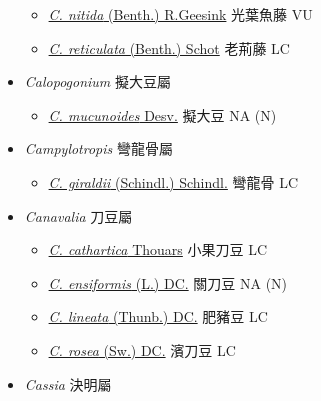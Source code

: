 \begin{itemize}
  \begin{itemize}
        \item[] \href{http://www.theplantlist.org/tpl1.1/search?q=Callerya+nitida}{\textit{C. nitida} (Benth.) R.Geesink}   光葉魚藤   VU
        \item[] \href{http://www.theplantlist.org/tpl1.1/search?q=Callerya+reticulata}{\textit{C. reticulata} (Benth.) Schot}   老荊藤   LC
  \end{itemize}
 \item[] \textit{Calopogonium} 擬大豆屬
                                
  \begin{itemize}
        \item[] \href{http://www.theplantlist.org/tpl1.1/search?q=Calopogonium+mucunoides}{\textit{C. mucunoides} Desv.}   擬大豆   NA (N)
  \end{itemize}
 \item[] \textit{Campylotropis} 彎龍骨屬
                                
  \begin{itemize}
        \item[] \href{http://www.theplantlist.org/tpl1.1/search?q=Campylotropis+giraldii}{\textit{C. giraldii} (Schindl.) Schindl.}   彎龍骨   LC
  \end{itemize}
 \item[] \textit{Canavalia} 刀豆屬
                                
  \begin{itemize}
        \item[] \href{http://www.theplantlist.org/tpl1.1/search?q=Canavalia+cathartica}{\textit{C. cathartica} Thouars}   小果刀豆   LC
        \item[] \href{http://www.theplantlist.org/tpl1.1/search?q=Canavalia+ensiformis}{\textit{C. ensiformis} (L.) DC.}   關刀豆   NA (N)
        \item[] \href{http://www.theplantlist.org/tpl1.1/search?q=Canavalia+lineata}{\textit{C. lineata} (Thunb.) DC.}   肥豬豆   LC
        \item[] \href{http://www.theplantlist.org/tpl1.1/search?q=Canavalia+rosea}{\textit{C. rosea} (Sw.) DC.}   濱刀豆   LC
  \end{itemize}
 \item[] \textit{Cassia} 決明屬
                                

\end{itemize}

